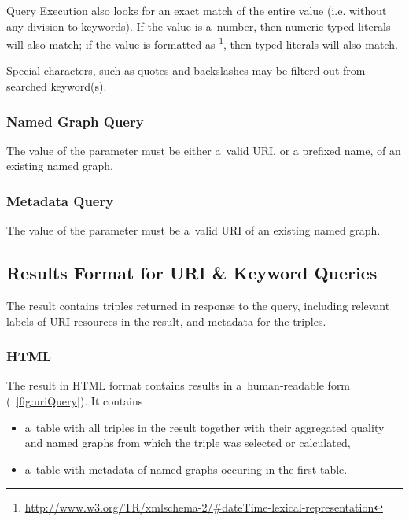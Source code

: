 {Query Execution also looks for an exact match of the entire  value (i.e. without any division to keywords). If the  value is a~number, then numeric typed literals will also match; if the  value is formatted as \footnote{\url{http://www.w3.org/TR/xmlschema-2/\#dateTime-lexical-representation}}, then  typed literals will also match.

Special characters, such as quotes and backslashes may be filterd out from searched keyword(s).

\subsubsection{Named Graph Query}
The value of the  parameter must be either a~valid URI, or a prefixed name, of an existing named graph.

\subsubsection{Metadata Query}
The value of the  parameter must be a~valid URI of an existing named graph.

\subsection{Results Format for URI \& Keyword Queries}
\label{sec:URIKWResultsFormat}

The result contains triples returned in response to the query, including relevant labels of URI resources in the result, and metadata for the triples.

\subsubsection{HTML}

The result in HTML format contains results in a~human-readable form (\figurename~\ref{fig:uriQuery}). It contains

\begin{itemize}
	\item a~table with all triples in the result together with their aggregated quality and named graphs from which the triple was selected or calculated,
  \item  a~table with metadata of named graphs occuring in the first table.
\end{itemize}

}

